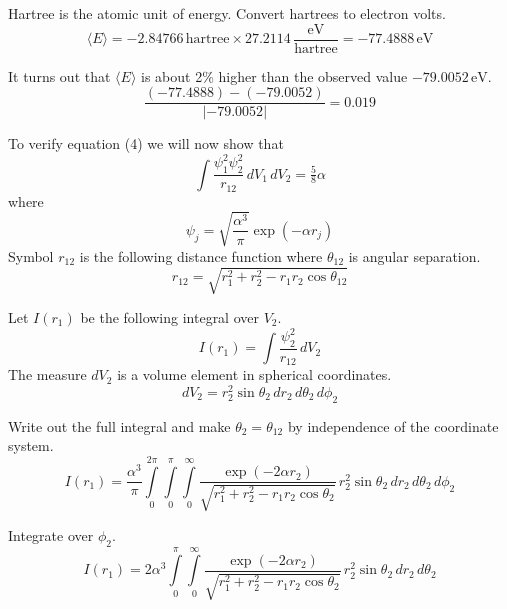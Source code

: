 \documentclass[12pt]{article}
\begin{document}
\noindent
Hartree is the atomic unit of energy.
Convert hartrees to electron volts.
\begin{equation*}
\langle E\rangle=-2.84766\,\text{hartree}\times27.2114\,\frac{\text{eV}}{\text{hartree}}=-77.4888\,\text{eV}
\end{equation*}

\noindent
It turns out that $\langle E\rangle$ is about 2\% higher than the observed value $-79.0052\,\text{eV}$.
\begin{equation*}
\frac{(-77.4888)-(-79.0052)}{|-79.0052|}=0.019
\end{equation*}

\noindent
To verify equation (4) we will now show that
\begin{equation*}
\int\frac{\psi_1^2\psi_2^2}{r_{12}}\,dV_1\,dV_2=\tfrac{5}{8}\alpha
\end{equation*}
where
\begin{equation*}
\psi_j=\sqrt{\frac{\alpha^3}{\pi}}\exp\left(-\alpha r_j\right)
\end{equation*}
Symbol $r_{12}$ is the following distance function where $\theta_{12}$ is angular separation.
\begin{equation*}
r_{12}=\sqrt{r_1^2+r_2^2-r_1r_2\cos\theta_{12}}
\end{equation*}

\noindent
Let $I(r_1)$ be the following integral over $V_2$.
\begin{equation*}
I(r_1)=\int\frac{\psi_2^2}{r_{12}}\,dV_2
\end{equation*}
The measure $dV_2$ is a volume element in spherical coordinates.
\begin{equation*}
dV_2=r_2^2\sin\theta_2\,dr_2\,d\theta_2\,d\phi_2
\end{equation*}

\noindent
Write out the full integral and make $\theta_2=\theta_{12}$ by independence of the coordinate system.
\begin{equation*}
I(r_1)=\frac{\alpha^3}{\pi}
\int\limits_0^{2\pi}\int\limits_0^\pi\int\limits_0^\infty
\frac{\exp(-2\alpha r_2)}{\sqrt{r_1^2+r_2^2-r_1r_2\cos\theta_2}}
\,r_2^2\sin\theta_2\,dr_2\,d\theta_2\,d\phi_2
\end{equation*}

\noindent
Integrate over $\phi_2$.
\begin{equation*}
I(r_1)=
2\alpha^3\int\limits_0^\pi\int\limits_0^\infty
\frac{\exp(-2\alpha r_2)}{\sqrt{r_1^2+r_2^2-r_1r_2\cos\theta_2}}
\,r_2^2\sin\theta_2\,dr_2\,d\theta_2
\end{equation*}
\end{document}
